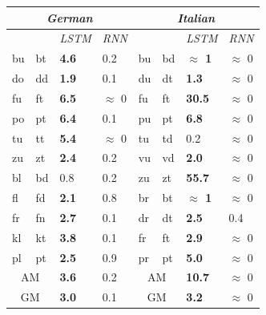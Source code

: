 \begin{table}[t]
  \begin{small}
    \begin{center}
      \begin{tabular}{p{0.2cm}p{0.2cm}|p{0.6cm}p{0.6cm}||p{0.2cm}p{0.2cm}|p{0.99cm}p{0.8cm}}
        \multicolumn{4}{c||}{\emph{German}}   &       \multicolumn{4}{c}{\emph{Italian}}\\      \hline
        \multicolumn{2}{c}{\emph{}}&\emph{LSTM}&\emph{RNN} & \multicolumn{2}{c}{\emph{}}&  \emph{LSTM}&\emph{RNN}\\      \hline
        bu &  bt &  \textbf{ 4.6} &  0.2             &  bu & bd & \textbf{ $\approx$ 1} & $\approx$ 0 \\            
        do &  dd &  \textbf{ 1.9} &  0.1             &  du & dt & \textbf{ 1.3} & $\approx$ 0 \\             
        fu &  ft &  \textbf{ 6.5} &  $\approx$ 0             &  fu & ft & \textbf{ 30.5} & $\approx$ 0 \\             
        po &  pt &  \textbf{ 6.4} &  0.1             &  pu & pt & \textbf{ 6.8} & $\approx$ 0 \\             
        tu &  tt &  \textbf{ 5.4} &  $\approx$ 0             &  tu & td &  0.2 & $\approx$ 0 \\                       
        zu &  zt &  \textbf{ 2.4} &  0.2             &  vu & vd & \textbf{ 2.0} & $\approx$ 0 \\              \cline{1-4}
        bl &  bd &   0.8          & 0.2              &  zu & zt & \textbf{ 55.7} & $\approx$ 0 \\              \cline{5-8} 
        fl &  fd &  \textbf{ 2.1} & 0.8              &  br & bt & \textbf{ $\approx$ 1}  &  $\approx$ 0           \\ 
        fr &  fn &  \textbf{ 2.7} & 0.1              &  dr & dt & \textbf{ 2.5} & 0.4 \\               
        kl &  kt &  \textbf{ 3.8} & 0.1              &  fr & ft & \textbf{ 2.9} & $\approx$ 0 \\             
        pl &  pt &  \textbf{ 2.5} & 0.9              &  pr & pt & \textbf{ 5.0} & $\approx$ 0 \\              \hline
        \multicolumn{2}{c|}{AM}      & \textbf{3.6} & 0.2     & 	    \multicolumn{2}{c|}{AM}   & \textbf{10.7}  & $\approx$ 0         \\
        \multicolumn{2}{c|}{GM} & \textbf{3.0} & 0.1          & 	    \multicolumn{2}{c|}{GM}   & \textbf{3.2} & $\approx$ 0           \\


\end{tabular}
\end{center}
\end{small}
\end{table}
